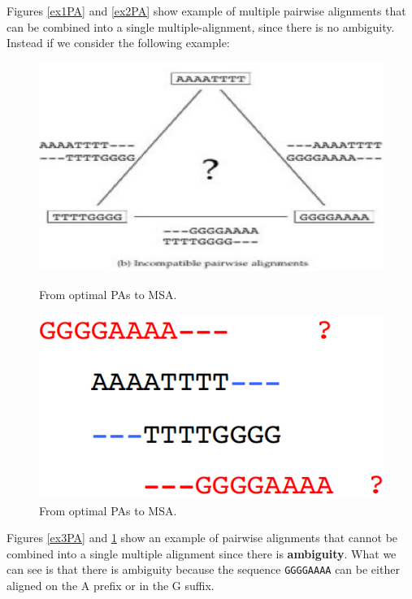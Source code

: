 Figures \ref{ex1PA} and \ref{ex2PA} show example of multiple pairwise alignments that can be combined into a single multiple-alignment, since there is no ambiguity. Instead if we consider the following example: \\

\begin{figure}[H]
	\begin{minipage}[t]{0.5\linewidth}
		\centering
		\includegraphics[width=1\textwidth]{img/nomsa1.png}
		\caption{From optimal PAs to MSA.}
		\label{ex3PA}
	\end{minipage}	
	\hspace{0.1cm}
	\begin{minipage}[t]{0.5\linewidth} 
		\centering
		\includegraphics[width=1\textwidth]{img/nomsa2.png}
		\caption{From optimal PAs to MSA.}
		\label{ex4PA}
	\end{minipage}        
\end{figure} 
Figures \ref{ex3PA} and \ref{ex4PA} show an example of pairwise alignments that cannot be combined into a single multiple alignment since there is \textbf{ambiguity}. What we can see is that there is ambiguity because the sequence \verb|GGGGAAAA| can be either aligned on the A prefix or in the G suffix.\\


